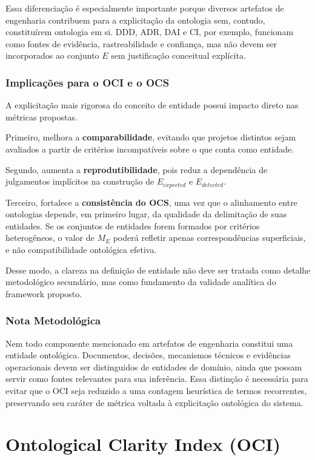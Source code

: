 \documentclass[12pt,a4paper]{article}
\begin{document}
Essa diferenciação é especialmente importante porque diversos artefatos de engenharia contribuem para a explicitação da ontologia sem, contudo, constituírem ontologia em si. DDD, ADR, DAI e CI, por exemplo, funcionam como fontes de evidência, rastreabilidade e confiança, mas não devem ser incorporados ao conjunto \(E\) sem justificação conceitual explícita.

\subsubsection{Implicações para o OCI e o OCS}

A explicitação mais rigorosa do conceito de entidade possui impacto direto nas métricas propostas.

Primeiro, melhora a \textbf{comparabilidade}, evitando que projetos distintos sejam avaliados a partir de critérios incompatíveis sobre o que conta como entidade.

Segundo, aumenta a \textbf{reprodutibilidade}, pois reduz a dependência de julgamentos implícitos na construção de \(E_{expected}\) e \(E_{detected}\).

Terceiro, fortalece a \textbf{consistência do OCS}, uma vez que o alinhamento entre ontologias depende, em primeiro lugar, da qualidade da delimitação de suas entidades. Se os conjuntos de entidades forem formados por critérios heterogêneos, o valor de \(M_E\) poderá refletir apenas correspondências superficiais, e não compatibilidade ontológica efetiva.

Desse modo, a clareza na definição de entidade não deve ser tratada como detalhe metodológico secundário, mas como fundamento da validade analítica do framework proposto.

\subsubsection{Nota Metodológica}

Nem todo componente mencionado em artefatos de engenharia constitui uma entidade ontológica. Documentos, decisões, mecanismos técnicos e evidências operacionais devem ser distinguidos de entidades de domínio, ainda que possam servir como fontes relevantes para sua inferência. Essa distinção é necessária para evitar que o OCI seja reduzido a uma contagem heurística de termos recorrentes, preservando seu caráter de métrica voltada à explicitação ontológica do sistema.

\section{Ontological Clarity Index (OCI)}
\end{document}
